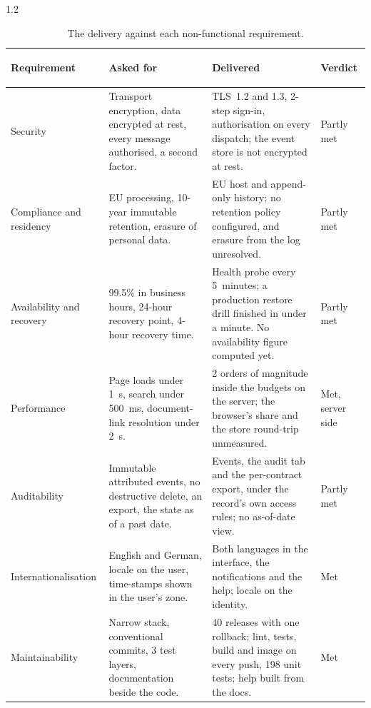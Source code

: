 \begin{spacing}{1.2}
\begin{table}[H]
  \centering
  \caption[The delivery against each non-functional requirement.]
          {The delivery against each non-functional requirement.}
  \label{tab:nfr-vs-delivered}
  \footnotesize
  \begin{tabularx}{\linewidth}%
    {|>{\bfseries\raggedright\arraybackslash}p{2.6cm}|X|X
     |>{\raggedright\arraybackslash}p{1.7cm}|}
    \hline
    Requirement & \textbf{Asked for} & \textbf{Delivered}
      & \textbf{Verdict} \\
    \hline\hline
    Security & Transport encryption, data encrypted at rest, every
      message authorised, a second factor. & TLS~1.2 and 1.3, 2-step
      sign-in, authorisation on every dispatch; the event store is not
      encrypted at rest. & Partly met \\
    \hline
    Compliance and resi\-dency & EU processing, 10-year immutable
      retention, erasure of personal data. & EU host and append-only
      history; no retention policy configured, and erasure from the log
      unresolved. & Partly met \\
    \hline
    Availability and recovery & 99.5\% in business hours, 24-hour
      recovery point, 4-hour recovery time. & Health probe every
      5~minutes; a production restore drill finished in under a minute.
      No availability figure computed yet. & Partly met \\
    \hline
    Performance & Page loads under 1~s, search under 500~ms,
      document-link resolution under 2~s. & 2 orders of magnitude inside
      the budgets on the server; the browser's share and the store
      round-trip unmeasured. & Met, server side \\
    \hline
    Audit\-ability & Immutable attributed events, no destructive delete,
      an export, the state as of a past date. & Events, the audit tab and
      the per-contract export, under the record's own access rules; no
      as-of-date view. & Partly met \\
    \hline
    Internation\-alisation & English and German, locale on the user,
      time-stamps shown in the user's zone. & Both languages in the
      interface, the notifications and the help; locale on the identity.
      & Met \\
    \hline
    Maintain\-ability & Narrow stack, conventional commits, 3 test
      layers, documentation beside the code. & 40 releases with one
      rollback; lint, tests, build and image on every push, 198 unit
      tests; help built from the docs. & Met \\
    \hline
  \end{tabularx}
\end{table}


\end{spacing}
